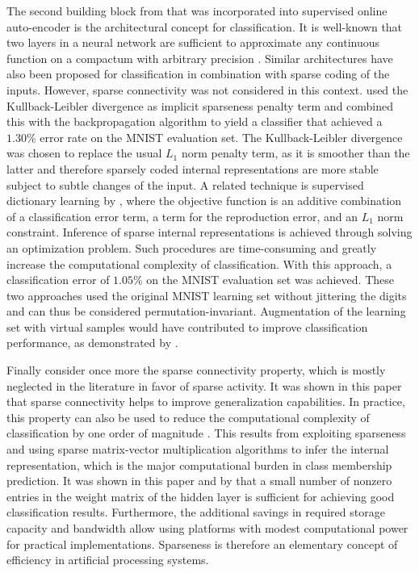 \documentclass[twoside,11pt]{article}
\newcommand{\0}{\mathcal{O}}
\begin{document}
The second building block from \citet{Thom2011d} that was incorporated into supervised online auto-encoder is the architectural concept for classification.
It is well-known that two layers in a neural network are sufficient to approximate any continuous function on a compactum with arbitrary precision \citep{Cybenko1989,Funahashi1989,Hornik1989}.
Similar architectures have also been proposed for classification in combination with sparse coding of the inputs.
However, sparse connectivity was not considered in this context.
\citet{Bradley2009} used the Kullback-Leibler divergence as implicit sparseness penalty term and combined this with the backpropagation algorithm to yield a classifier that achieved a $1.30\%$ error rate on the MNIST evaluation set.
The Kullback-Leibler divergence was chosen to replace the usual $L_1$ norm penalty term, as it is smoother than the latter and therefore sparsely coded internal representations are more stable subject to subtle changes of the input.
A related technique is supervised dictionary learning by \citet{Mairal2009b}, where the objective function is an additive combination of a classification error term, a term for the reproduction error, and an $L_1$ norm constraint.
Inference of sparse internal representations is achieved through solving an optimization problem.
Such procedures are time-consuming and greatly increase the computational complexity of classification.
With this approach, a classification error of $1.05\%$ on the MNIST evaluation set was achieved.
These two approaches used the original MNIST learning set without jittering the digits and can thus be considered permutation-invariant.
Augmentation of the learning set with virtual samples would have contributed to improve classification performance, as demonstrated by \citet{Schoelkopf1997}.

Finally consider once more the sparse connectivity property, which is mostly neglected in the literature in favor of sparse activity.
It was shown in this paper that sparse connectivity helps to improve generalization capabilities.
In practice, this property can also be used to reduce the computational complexity of classification by one order of magnitude \citep{Thom2011e}.
This results from exploiting sparseness and using sparse matrix-vector multiplication algorithms to infer the internal representation, which is the major computational burden in class membership prediction.
It was shown in this paper and by \citet{Thom2011e} that a small number of nonzero entries in the weight matrix of the hidden layer is sufficient for achieving good classification results.
Furthermore, the additional savings in required storage capacity and bandwidth allow using platforms with modest computational power for practical implementations.
Sparseness is therefore an elementary concept of efficiency in artificial processing systems.
\end{document}
